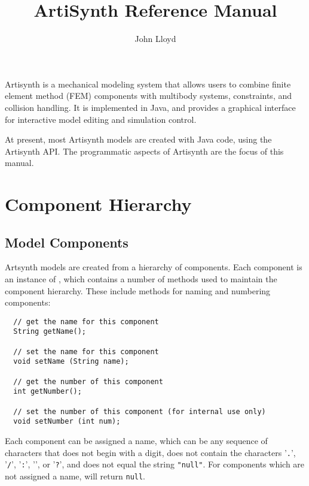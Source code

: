 \documentclass{article}
\title{ArtiSynth Reference Manual}
\author{John Lloyd}
\date{}
\begin{document}
\maketitle

\iflatexml{\large\pubdate}\fi

\tableofcontents

Artisynth is a mechanical modeling system that allows users to combine
finite element method (FEM) components with multibody systems,
constraints, and collision handling. It is implemented in Java, and
provides a graphical interface for interactive model editing and
simulation control.

At present, most Artisynth models are created with Java code, using the
Artisynth API. The programmatic aspects of Artisynth are the focus of
this manual.


\section{Component Hierarchy}
\label{ComponentHierarchy}

\subsection{Model Components}

Artsynth models are created from a hierarchy of components. Each
component is an instance of , which contains 
a number of methods used to maintain the component hierarchy.
These include methods for naming and numbering components:

\begin{lstlisting}
  // get the name for this component
  String getName();

  // set the name for this component
  void setName (String name);

  // get the number of this component
  int getNumber();

  // set the number of this component (for internal use only)
  void setNumber (int num);
\end{lstlisting}

Each component can be assigned a name, which can be any sequence of
characters that does not begin with a digit, does not contain the
characters '{\tt .}', '{\tt /}', '{\tt :}', '{\tt *}', or '{\tt ?}',
and does not equal the string {\tt "null"}.
For components which are not assigned a name,
 will return {\tt null}.
\end{document}
